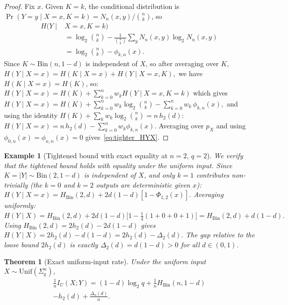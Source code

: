 \documentclass[conference]{IEEEtran}
\newtheorem{theorem}{Theorem}
\newtheorem{example}{Example}
\begin{document}
\begin{proof}
Fix $x$.  Given $K=k$, the conditional distribution is
$\Pr(Y=y\mid X=x,K=k)=N_n(x,y)/\binom{n}{k}$, so
\begin{align}
  H(Y\mid & X=x,K=k) \nonumber \\
  &=\log_2\binom{n}{k}
   -\frac{1}{\binom{n}{k}}\sum_y N_n(x,y)\log_2 N_n(x,y) \nonumber \\
  &=\log_2\binom{n}{k}-\phi_{k,n}(x).
\end{align}
Since $K\sim\mathrm{Bin}(n,1-d)$ is independent of $X$, 
so after averaging over $K$, 
\(
H(Y \mid X = x) 
= H(K \mid X = x) + H(Y \mid X = x, K),
\)
we have $H(K \mid X = x) = H(K)$, so:
\(
H(Y \mid X = x) = H(K) + \sum_{k=0}^{n} w_k H(Y \mid X = x, K = k)
\)
which gives
\(
H(Y \mid X = x) = H(K)
+ \sum_{k=0}^{n} w_k \log_2\! \binom{n}{k}
- \sum_{k=0}^{n} w_k \,\phi_{k,n}(x),
\)
and using
the identity $H(K)+\sum_k w_k\log_2\binom{n}{k}
=n\,h_2(d)$:
\(
  H(Y\mid X=x)= n\,h_2(d)-\sum_{k=0}^n w_k\phi_{k,n}(x).
\)
Averaging over $p_X$ and using $\phi_{0,n}(x)=\phi_{n,n}(x)=0$
gives~\eqref{eq:tighter_HYX}.
\end{proof}

\begin{example}[Tightened bound with exact equality at $n=2$, $q=2$]
\label{ex:equality}
We verify that the tightened bound holds with equality under the
uniform input.  Since $K=|Y|\sim\mathrm{Bin}(2,1-d)$ is independent
of $X$, and only $k=1$ contributes non-trivially (the $k=0$ and $k=2$
outputs are deterministic given $x$):
\(
H(Y\mid X=x)=H_{\mathrm{Bin}}(2,d)+2d(1-d)[1-\Phi_{1,2}(x)].
\)
Averaging uniformly:
\(
H(Y\mid X)
  =H_{\mathrm{Bin}}(2,d)+2d(1-d)\bigl[1-\tfrac{1}{4}(1+0+0+1)\bigr]
  =H_{\mathrm{Bin}}(2,d)+d(1-d).
\)
Using $H_{\mathrm{Bin}}(2,d)=2h_2(d)-2d(1-d)$ gives 
\(
H(Y\mid X)=2h_2(d)-d(1-d)=2h_2(d)-\Delta_2(d).
\)
The gap relative to the loose bound $2h_2(d)$ is exactly
$\Delta_2(d)=d(1-d)>0$ for all $d\in(0,1)$.
\end{example}


\begin{theorem}[Exact uniform-input rate]
\label{thm:exact_uniform_rate}
Under the uniform input $X\sim\mathrm{Unif}(\Sigma_q^n)$,
\begin{align}
  \frac{1}{n}I_U(X;Y)
  = (1-d)\log_2 q
    + \frac{1}{n}H_{\mathrm{Bin}}(n,1-d) \nonumber \\
    - h_2(d)
    + \frac{\Delta_n(d)}{n}.
  \label{eq:exact_uniform_rate}
\end{align}
\end{theorem}
\end{document}
